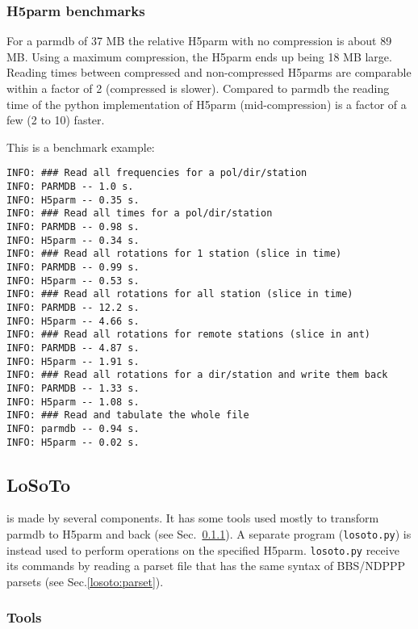 \documentclass[structabstract]{article}
\begin{document}
\subsubsection{H5parm benchmarks}

For a parmdb of 37 MB the relative H5parm with no compression is about 89 MB. Using a maximum compression, the H5parm ends up being 18 MB large. Reading times between compressed and non-compressed H5parms are comparable within a factor of 2 (compressed is slower). Compared to parmdb the reading time of the python implementation of H5parm (mid-compression) is a factor of a few (2 to 10) faster.

This is a benchmark example:

\begin{verbatim}
INFO: ### Read all frequencies for a pol/dir/station
INFO: PARMDB -- 1.0 s.
INFO: H5parm -- 0.35 s.
INFO: ### Read all times for a pol/dir/station
INFO: PARMDB -- 0.98 s.
INFO: H5parm -- 0.34 s.
INFO: ### Read all rotations for 1 station (slice in time)
INFO: PARMDB -- 0.99 s.
INFO: H5parm -- 0.53 s.
INFO: ### Read all rotations for all station (slice in time)
INFO: PARMDB -- 12.2 s.
INFO: H5parm -- 4.66 s.
INFO: ### Read all rotations for remote stations (slice in ant)
INFO: PARMDB -- 4.87 s.
INFO: H5parm -- 1.91 s.
INFO: ### Read all rotations for a dir/station and write them back
INFO: PARMDB -- 1.33 s.
INFO: H5parm -- 1.08 s.
INFO: ### Read and tabulate the whole file
INFO: parmdb -- 0.94 s.
INFO: H5parm -- 0.02 s.
\end{verbatim}

\subsection{LoSoTo}
\label{losoto:overview}

\losoto{} is made by several components. It has some tools used mostly to transform parmdb to H5parm and back (see Sec.~\ref{losoto:tools}). A separate program (\texttt{losoto.py}) is instead used to perform operations on the specified H5parm. \texttt{losoto.py} receive its commands by reading a parset file that has the same syntax of BBS/NDPPP parsets (see Sec.\ref{losoto:parset}).

\subsubsection{Tools}
\label{losoto:tools}
\end{document}

